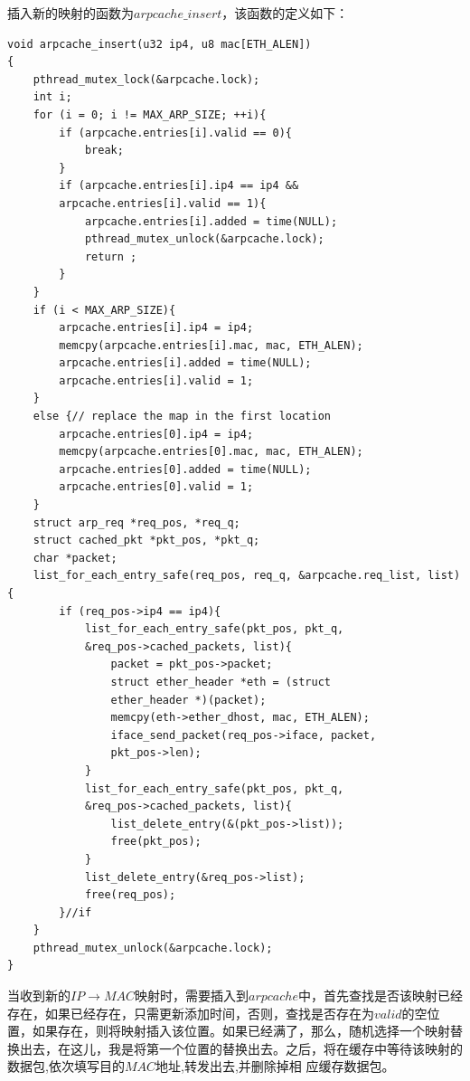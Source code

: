 \documentclass[UTF8,noindent]{ctexart}
\begin{document}
插入新的映射的函数为$arpcache\_insert$，该函数的定义如下：
\begin{lstlisting}
void arpcache_insert(u32 ip4, u8 mac[ETH_ALEN])
{
	pthread_mutex_lock(&arpcache.lock);
	int i;
	for (i = 0; i != MAX_ARP_SIZE; ++i){
		if (arpcache.entries[i].valid == 0){
			break;
		}
		if (arpcache.entries[i].ip4 == ip4 && 
		arpcache.entries[i].valid == 1){
			arpcache.entries[i].added = time(NULL);
			pthread_mutex_unlock(&arpcache.lock);
			return ;
		}
	}
	if (i < MAX_ARP_SIZE){
		arpcache.entries[i].ip4 = ip4;
		memcpy(arpcache.entries[i].mac, mac, ETH_ALEN);
		arpcache.entries[i].added = time(NULL);
		arpcache.entries[i].valid = 1;
	}
	else {// replace the map in the first location
		arpcache.entries[0].ip4 = ip4;
		memcpy(arpcache.entries[0].mac, mac, ETH_ALEN);
		arpcache.entries[0].added = time(NULL);
		arpcache.entries[0].valid = 1;
	}
	struct arp_req *req_pos, *req_q;
	struct cached_pkt *pkt_pos, *pkt_q;
	char *packet;
	list_for_each_entry_safe(req_pos, req_q, &arpcache.req_list, list){
		if (req_pos->ip4 == ip4){
			list_for_each_entry_safe(pkt_pos, pkt_q,
			&req_pos->cached_packets, list){
				packet = pkt_pos->packet;
				struct ether_header *eth = (struct 
				ether_header *)(packet);
				memcpy(eth->ether_dhost, mac, ETH_ALEN);
				iface_send_packet(req_pos->iface, packet, 
				pkt_pos->len);
			}
			list_for_each_entry_safe(pkt_pos, pkt_q, 
			&req_pos->cached_packets, list){
				list_delete_entry(&(pkt_pos->list));
				free(pkt_pos);
			}
			list_delete_entry(&req_pos->list);
			free(req_pos);
		}//if
	}
	pthread_mutex_unlock(&arpcache.lock);
}
\end{lstlisting}
当收到新的$IP\rightarrow MAC$映射时，需要插入到$arpcache$中，首先查找是否该映射已经存在，如果已经存在，只需更新添加时间，否则，查找是否存在为$valid$的空位置，如果存在，则将映射插入该位置。如果已经满了，那么，随机选择一个映射替换出去，在这儿，我是将第一个位置的替换出去。之后，将在缓存中等待该映射的数据包,依次填写目的$MAC$地址,转发出去,并删除掉相
应缓存数据包。
\end{document}
